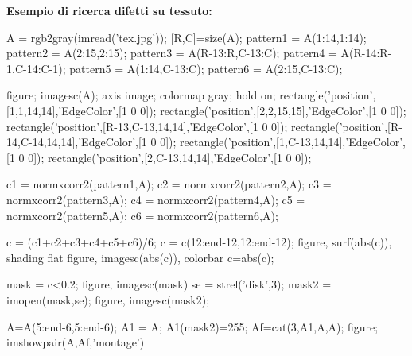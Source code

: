 \documentclass[a4paper, 10pt]{report}
\begin{document}
\noindent \textbf{Esempio di ricerca difetti su tessuto:}

\begin{code}

A = rgb2gray(imread('tex.jpg'));
[R,C]=size(A);
pattern1 = A(1:14,1:14);
pattern2 = A(2:15,2:15);
pattern3 = A(R-13:R,C-13:C);
pattern4 = A(R-14:R-1,C-14:C-1);
pattern5 = A(1:14,C-13:C);
pattern6 = A(2:15,C-13:C);

figure;
imagesc(A); axis image; colormap gray; hold on;
rectangle('position',[1,1,14,14],'EdgeColor',[1 0 0]);%
rectangle('position',[2,2,15,15],'EdgeColor',[1 0 0]);
rectangle('position',[R-13,C-13,14,14],'EdgeColor',[1 0 0]);
rectangle('position',[R-14,C-14,14,14],'EdgeColor',[1 0 0]);
rectangle('position',[1,C-13,14,14],'EdgeColor',[1 0 0]);
rectangle('position',[2,C-13,14,14],'EdgeColor',[1 0 0]);

c1 = normxcorr2(pattern1,A);
c2 = normxcorr2(pattern2,A);
c3 = normxcorr2(pattern3,A);
c4 = normxcorr2(pattern4,A);
c5 = normxcorr2(pattern5,A);
c6 = normxcorr2(pattern6,A);

c = (c1+c2+c3+c4+c5+c6)/6;
c = c(12:end-12,12:end-12);
figure, surf(abs(c)), shading flat
figure, imagesc(abs(c)), colorbar
c=abs(c);

mask = c<0.2; %
figure, imagesc(mask)
se = strel('disk',3);
mask2 = imopen(mask,se);
figure, imagesc(mask2);

A=A(5:end-6,5:end-6);
A1 = A;
A1(mask2)=255;
Af=cat(3,A1,A,A);
 figure;
imshowpair(A,Af,'montage')
\end{code}
\end{document}
